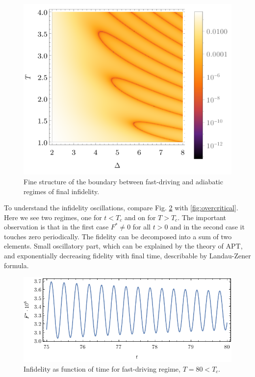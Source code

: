 \begin{figure}[H]
    \centering 
    \includegraphics[scale=1.2]{../img/dens2Zoom.pdf}
    \caption{Fine structure of the boundary between fast-driving and adiabatic regimes of final infidelity.}
    \label{fig:dens2Zoom}
\end{figure}



To understand the infidelity oscillations, compare Fig. \ref{fig:undercritical} with \ref{fig:overcritical}. Here we see two regimes, one for $t<T_c$ and on for $T>T_c$. The important observation is that in the first case $F^*\neq 0$ for all $t>0$ and in the second case it touches zero periodically. The fidelity can be decomposed into a sum of two elements. Small oscillatory part, which can be explained by the theory of APT, and exponentially decreasing fidelity with final time, describable by Landau-Zener formula.

\begin{figure}[H]
    \centering
    \includegraphics[scale=1.2]{../img/undercritical.pdf}
    \caption{Infidelity as function of time for fast-driving regime, $T=80<T_c$.}
    \label{fig:undercritical}
\end{figure}


